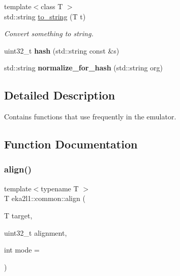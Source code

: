 \begin{DoxyCompactItemize}
\mbox{\label{namespaceeka2l1_1_1common_a90f0435776b930c3c275a2c5cc98da82}} 
{\footnotesize template$<$class T $>$ }\\std\+::string \mbox{\hyperlink{namespaceeka2l1_1_1common_a90f0435776b930c3c275a2c5cc98da82}{to\+\_\+string}} (T t)
\begin{DoxyCompactList}\small\item\em Convert something to string. \end{DoxyCompactList}\item 
\mbox{\label{namespaceeka2l1_1_1common_a7b5961e453acd4e01bfc9f5e20aebc5f}} 
uint32\+\_\+t {\bfseries hash} (std\+::string const \&s)
\item 
\mbox{\label{namespaceeka2l1_1_1common_a46760a5e383a1c62da10a376bb5b4072}} 
std\+::string {\bfseries normalize\+\_\+for\+\_\+hash} (std\+::string org)
\end{DoxyCompactItemize}


\subsection{Detailed Description}
Contains functions that use frequently in the emulator. 

\subsection{Function Documentation}
\mbox{\label{namespaceeka2l1_1_1common_a1c506a2ff45e6a4439e7f48884eebc81}} 
\subsubsection{\texorpdfstring{align()}{align()}}
{\footnotesize\ttfamily template$<$typename T $>$ \\
T eka2l1\+::common\+::align (\begin{DoxyParamCaption}\item[{T}]{target,  }\item[{uint32\+\_\+t}]{alignment,  }\item[{int}]{mode = {} }\end{DoxyParamCaption})}

